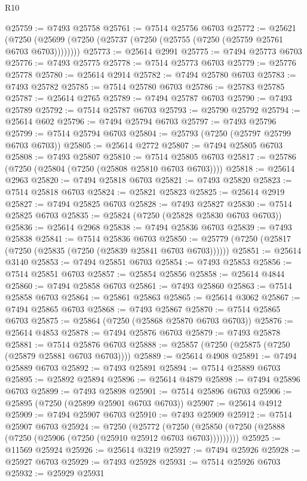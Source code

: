 \begin{lexlean}{R10}
\begin{coremodule}
@25759 := @7493 @25758
@25761 := @7514 @25756 @6703
@25772 := @25621
    (@7250 (@25699 (@7250 (@25737 (@7250 (@25755 (@7250 (@25759 @25761 @6703 @6703))))))))
@25773 := @25614 @2991
@25775 := @7494 @25773 @6703
@25776 := @7493 @25775
@25778 := @7514 @25773 @6703
@25779 := @25776 @25778
@25780 := @25614 @2914
@25782 := @7494 @25780 @6703
@25783 := @7493 @25782
@25785 := @7514 @25780 @6703
@25786 := @25783 @25785
@25787 := @25614 @2765
@25789 := @7494 @25787 @6703
@25790 := @7493 @25789
@25792 := @7514 @25787 @6703
@25793 := @25790 @25792
@25794 := @25614 @602
@25796 := @7494 @25794 @6703
@25797 := @7493 @25796
@25799 := @7514 @25794 @6703
@25804 := @25793 (@7250 (@25797 @25799 @6703 @6703))
@25805 := @25614 @2772
@25807 := @7494 @25805 @6703
@25808 := @7493 @25807
@25810 := @7514 @25805 @6703
@25817 := @25786 (@7250 (@25804 (@7250 (@25808 @25810 @6703 @6703))))
@25818 := @25614 @2963
@25820 := @7494 @25818 @6703
@25821 := @7493 @25820
@25823 := @7514 @25818 @6703
@25824 := @25821 @25823
@25825 := @25614 @2919
@25827 := @7494 @25825 @6703
@25828 := @7493 @25827
@25830 := @7514 @25825 @6703
@25835 := @25824 (@7250 (@25828 @25830 @6703 @6703))
@25836 := @25614 @2968
@25838 := @7494 @25836 @6703
@25839 := @7493 @25838
@25841 := @7514 @25836 @6703
@25850 := @25779 (@7250 (@25817 (@7250 (@25835 (@7250 (@25839 @25841 @6703 @6703))))))
@25851 := @25614 @3140
@25853 := @7494 @25851 @6703
@25854 := @7493 @25853
@25856 := @7514 @25851 @6703
@25857 := @25854 @25856
@25858 := @25614 @4844
@25860 := @7494 @25858 @6703
@25861 := @7493 @25860
@25863 := @7514 @25858 @6703
@25864 := @25861 @25863
@25865 := @25614 @3062
@25867 := @7494 @25865 @6703
@25868 := @7493 @25867
@25870 := @7514 @25865 @6703
@25875 := @25864 (@7250 (@25868 @25870 @6703 @6703))
@25876 := @25614 @4853
@25878 := @7494 @25876 @6703
@25879 := @7493 @25878
@25881 := @7514 @25876 @6703
@25888 := @25857 (@7250 (@25875 (@7250 (@25879 @25881 @6703 @6703))))
@25889 := @25614 @4908
@25891 := @7494 @25889 @6703
@25892 := @7493 @25891
@25894 := @7514 @25889 @6703
@25895 := @25892 @25894
@25896 := @25614 @4879
@25898 := @7494 @25896 @6703
@25899 := @7493 @25898
@25901 := @7514 @25896 @6703
@25906 := @25895 (@7250 (@25899 @25901 @6703 @6703))
@25907 := @25614 @4912
@25909 := @7494 @25907 @6703
@25910 := @7493 @25909
@25912 := @7514 @25907 @6703
@25924 := @7250
    (@25772 (@7250 (@25850 (@7250 (@25888 (@7250 (@25906 (@7250 (@25910 @25912 @6703 @6703)))))))))
@25925 := @11569 @25924
@25926 := @25614 @3219
@25927 := @7494 @25926
@25928 := @25927 @6703
@25929 := @7493 @25928
@25931 := @7514 @25926 @6703
@25932 := @25929 @25931

\end{coremodule}
\end{lexlean}
